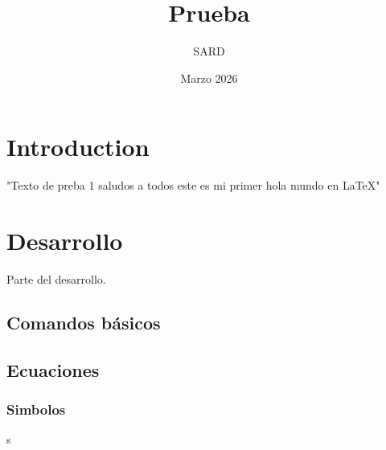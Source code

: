 \documentclass[12pt, letterpaper]{article} %
\title{Prueba} %
\author{SARD}
\date{Marzo 2026}
\begin{document}
\maketitle

\newpage 

\tableofcontents 

\listoffigures

\listoftables

\section{Introduction}

"Texto de preba 1 saludos a todos este es mi primer hola mundo en LaTeX"

\section{Desarrollo}
Parte del desarrollo.

\subsection{Comandos básicos}

\subsection{Ecuaciones}

\subsubsection{Simbolos}s
\end{document}
